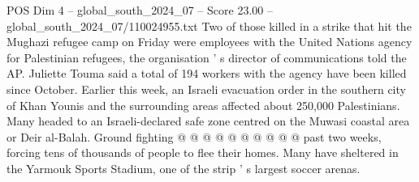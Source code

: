 \begin{textsample}{POS Dim 4 – global\_south\_2024\_07 – Score 23.00 – global\_south\_2024\_07/110024955.txt}
Two of those killed in a strike that hit the Mughazi refugee camp on Friday were employees with the United Nations agency for Palestinian refugees, the organisation ' s director of communications told the AP.
Juliette Touma said a total of 194 workers with the agency have been killed since October.
Earlier this week, an Israeli evacuation order in the southern city of Khan Younis and the surrounding areas affected about 250,000 Palestinians.
Many headed to an Israeli-declared safe zone centred on the Muwasi coastal area or Deir al-Balah.
Ground fighting @ @ @ @ @ @ @ @ @ @ past two weeks, forcing tens of thousands of people to flee their homes.
Many have sheltered in the Yarmouk Sports Stadium, one of the strip ' s largest soccer arenas.

\end{textsample}
